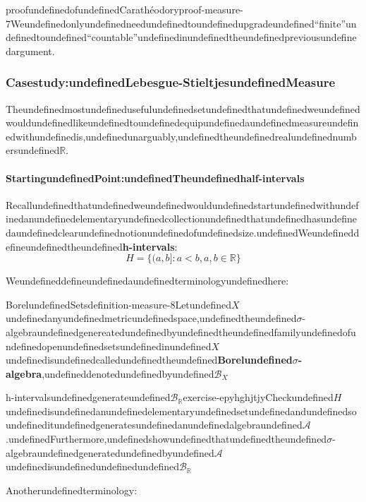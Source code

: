 \begin{mystthmproof}{proofundefinedofundefinedCarathéodory}{proof-measure-7}Weundefinedonlyundefinedneedundefinedtoundefinedupgradeundefined``finite''undefinedtoundefined``countable''undefinedinundefinedtheundefinedpreviousundefinedargument.

\end{mystthmproof}
\subsubsection{Casestudy:undefinedLebesgue-StieltjesundefinedMeasure}

Theundefinedmostundefinedusefulundefinedsetundefinedthatundefinedweundefinedwouldundefinedlikeundefinedtoundefinedequipundefinedaundefinedmeasureundefinedwithundefinedis,undefinedunarguably,undefinedtheundefinedrealundefinednumbersundefined$\mathbb{R}$.

\paragraph{StartingundefinedPoint:undefinedTheundefinedhalf-intervals}

Recallundefinedthatundefinedweundefinedwouldundefinedstartundefinedwithundefinedanundefinedelementaryundefinedcollectionundefinedthatundefinedhasundefinedaundefinedclearundefinednotionundefinedofundefinedsize.undefinedWeundefineddefineundefinedtheundefined\textbf{h-intervals}:
\begin{equation}
H=\{(a,b]:a<b, a,b\in \mathbb{R}\}
\end{equation}

Weundefineddefineundefinedaundefinedterminologyundefinedhere:

\begin{mystthmdefinition}{BorelundefinedSets}{definition-measure-8}Letundefined$X$undefinedanyundefinedmetricundefinedspace,undefinedtheundefined$\sigma$-algebraundefinedgenereatedundefinedbyundefinedtheundefinedfamilyundefinedofundefinedopenundefinedsetsundefinedinundefined$X$undefinedisundefinedcalledundefinedtheundefined\textbf{Borelundefined$\sigma$-algebra},undefineddenotedundefinedbyundefined$\mathcal B_{X}$

\end{mystthmdefinition}
\begin{mystexercise}{h-intervalsundefinedgenerateundefined$\mathcal B_{\mathbb{R}}$}{exercise-epyhghjtjy}\label{exercise-epYhghjTJy}\label{exercise-epyhghjtjy}Checkundefined$H$undefinedisundefinedanundefinedelementaryundefinedsetundefinedandundefinedsoundefineditundefinedgeneratesundefinedanundefinedalgebraundefined$\mathcal A$.undefinedFurthermore,undefinedshowundefinedthatundefinedtheundefined$\sigma$-algebraundefinedgeneratedundefinedbyundefined$\mathcal A$undefinedisundefinedundefinedundefined$\mathcal B_{\mathbb{R}}$

\end{mystexercise}
Anotherundefinedterminology:

